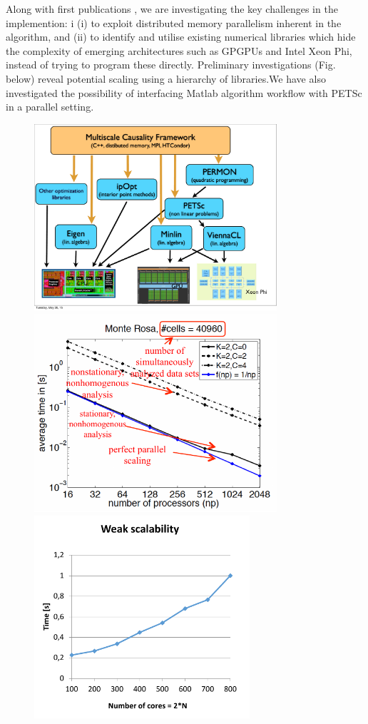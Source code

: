 \documentclass[a0,portrait]{a0poster}
\begin{document}
\begin{multicols}{2}
\vspace{-0.5cm}
\noindent

{\large Along with first publications \cite{horenko_scienceadvances_2015,gagliardini_econometrica_2015}, we are investigating the key challenges in the implemention: i (i) to exploit distributed memory parallelism inherent in the algorithm, and (ii) to identify and utilise existing numerical libraries which hide the complexity of emerging architectures such as GPGPUs and Intel Xeon Phi, instead of trying to program these directly.  Preliminary investigations (Fig. below) reveal potential scaling using a hierarchy of libraries.We have also investigated the possibility of interfacing Matlab algorithm workflow with PETSc in a parallel setting.}

\begin{figure}[H]
\begin{center} \centerline{
\includegraphics[width=9cm]{Library_Hierarchy.pdf}
\includegraphics[width=9cm]{Scaling.pdf}
\includegraphics[width=8cm]{FLLOP_weak_scalability.pdf}
}
\end{center}
\end{figure}
\end{multicols}
\end{document}
